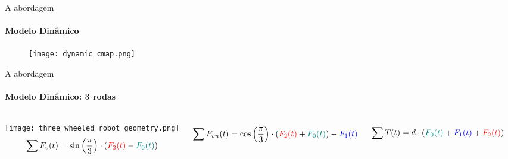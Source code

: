 \begin{frame}[c]{A abordagem}
  \framesubtitle{Modelo Dinâmico}
  \transdissolve[duration=0.5]

  \begin{figure}[ht!]
    \centering

    \texttt{[image: dynamic\_cmap.png]}
    \label{fig:dynamic_map}

  \end{figure}


\end{frame}

\begin{frame}[t]{A abordagem}
  \transboxout[duration=0.5]
  \framesubtitle{Modelo Dinâmico: 3 rodas}
  \begin{columns}
    \texttt{[image: three\_wheeled\_robot\_geometry.png]}
      \begin{equation*}
        \sum F_v(t) = 
        \sin \left( \frac{\pi}{3} \right) \cdot
        \left(
          {\color[rgb]{1,0,0} F_2(t)} - 
          {\color[rgb]{0,0.5,0.5} F_0(t)}
        \right)
      \end{equation*}

      \begin{equation*}
        \sum F_{vn}(t) =
        \cos \left( \frac{\pi}{3} \right) \cdot
        \left(
          {\color[rgb]{1,0,0} F_2(t)} +
          {\color[rgb]{0,0.5,0.5} F_0(t)}
        \right) - 
        {\color[rgb]{0,0,1} F_1(t)}
      \end{equation*}

      \begin{equation*}
        \sum T(t) =
        d \cdot
        \left(
          {\color[rgb]{0,0.5,0.5} F_0(t)} +
          {\color[rgb]{0,0,1} F_1(t)} +
          {\color[rgb]{1,0,0} F_2(t)}
        \right)
      \end{equation*}
  \end{columns}
\end{frame}

